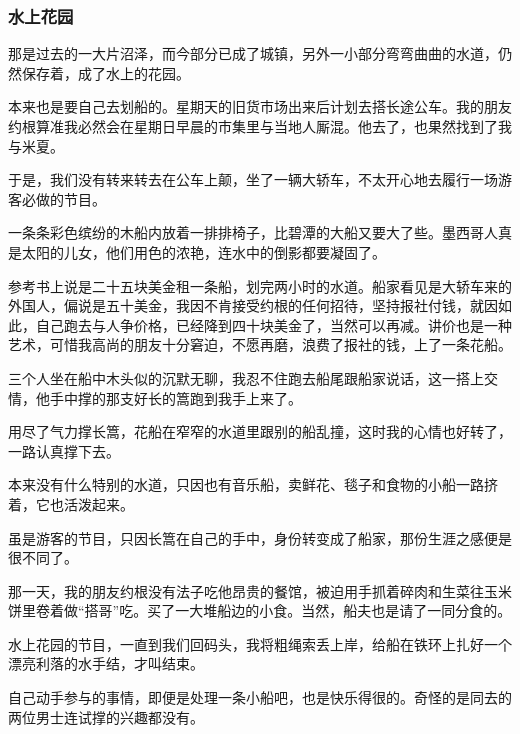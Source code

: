 \subsubsection*{水上花园}
\par 那是过去的一大片沼泽，而今部分已成了城镇，另外一小部分弯弯曲曲的水道，仍然保存着，成了水上的花园。
\par 本来也是要自己去划船的。星期天的旧货市场出来后计划去搭长途公车。我的朋友约根算准我必然会在星期日早晨的市集里与当地人厮混。他去了，也果然找到了我与米夏。
\par 于是，我们没有转来转去在公车上颠，坐了一辆大轿车，不太开心地去履行一场游客必做的节目。
\par 一条条彩色缤纷的木船内放着一排排椅子，比碧潭的大船又要大了些。墨西哥人真是太阳的儿女，他们用色的浓艳，连水中的倒影都要凝固了。
\par 参考书上说是二十五块美金租一条船，划完两小时的水道。船家看见是大轿车来的外国人，偏说是五十美金，我因不肯接受约根的任何招待，坚持报社付钱，就因如此，自己跑去与人争价格，已经降到四十块美金了，当然可以再减。讲价也是一种艺术，可惜我高尚的朋友十分窘迫，不愿再磨，浪费了报社的钱，上了一条花船。
\par 三个人坐在船中木头似的沉默无聊，我忍不住跑去船尾跟船家说话，这一搭上交情，他手中撑的那支好长的篙跑到我手上来了。
\par 用尽了气力撑长篙，花船在窄窄的水道里跟别的船乱撞，这时我的心情也好转了，一路认真撑下去。
\par 本来没有什么特别的水道，只因也有音乐船，卖鲜花、毯子和食物的小船一路挤着，它也活泼起来。
\par 虽是游客的节目，只因长篙在自己的手中，身份转变成了船家，那份生涯之感便是很不同了。
\par 那一天，我的朋友约根没有法子吃他昂贵的餐馆，被迫用手抓着碎肉和生菜往玉米饼里卷着做“搭哥”吃。买了一大堆船边的小食。当然，船夫也是请了一同分食的。
\par 水上花园的节目，一直到我们回码头，我将粗绳索丢上岸，给船在铁环上扎好一个漂亮利落的水手结，才叫结束。
\par 自己动手参与的事情，即便是处理一条小船吧，也是快乐得很的。奇怪的是同去的两位男士连试撑的兴趣都没有。


